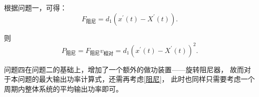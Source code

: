 \documentclass[UTF8]{ctexart}
\begin{document}
根据问题一，可得：
\begin{equation}\label{阻尼}
F_\text{阻尼}=d_1\left(x^{'}(t)-X^{'}(t)\right).    
\end{equation}

则
\begin{equation}
P_\text{阻尼}=F_\text{阻尼}v_\text{相对}=d_1\left(x^{'}(t)-X^{'}(t)\right)^2.    
\end{equation}

问题四在问题二的基础上，增加了一个额外的做功装置——旋转阻尼器，
故而对于本问题的最大输出功率计算式，还需再考虑\eqref{阻尼}，
此时也同样只需要考虑一个周期内整体系统的平均输出功率即可。
\end{document}

